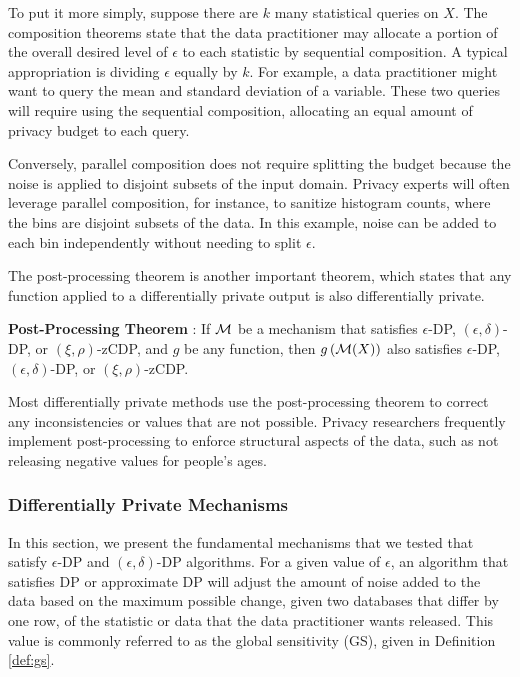 To put it more simply, suppose there are $k$ many statistical queries on $X$. The composition theorems state that the data practitioner may allocate a portion of the overall desired level of $\epsilon$ to each statistic by sequential composition. A typical appropriation is dividing $\epsilon$ equally by $k$. For example, a data practitioner might want to query the mean and standard deviation of a variable. These two queries will require using the sequential composition, allocating an equal amount of privacy budget to each query.

Conversely, parallel composition does not require splitting the budget because the noise is applied to disjoint subsets of the input domain. Privacy experts will often leverage parallel composition, for instance, to sanitize histogram counts, where the bins are disjoint subsets of the data. In this example, noise can be added to each bin independently without needing to split $\epsilon$.

The post-processing theorem is another important theorem, which states that any function applied to a differentially private output is also differentially private.

\begin{thm}\label{thm:post} \textbf{Post-Processing Theorem} \citep{dwork2006calibrating,nissim2007smooth, bun2016concentrated}:
If $\mathcal{M}$ be a mechanism that satisfies $\epsilon$-DP, $(\epsilon,\delta)$-DP, or $(\xi,\rho)$-zCDP, and $g$ be any function, then $g\left(\mathcal{M}(X)\right)$ also satisfies $\epsilon$-DP, $(\epsilon,\delta)$-DP, or $(\xi,\rho)$-zCDP.
\end{thm}

Most differentially private methods use the post-processing theorem to correct any inconsistencies or values that are not possible. Privacy researchers frequently implement post-processing to enforce structural aspects of the data, such as not releasing negative values for people's ages.

\subsubsection{Differentially Private Mechanisms}\label{subsec:mech}
In this section, we present the fundamental mechanisms that we tested that satisfy $\epsilon$-DP and $(\epsilon, \delta)$-DP algorithms. For a given value of $\epsilon$, an algorithm that satisfies DP or approximate DP will adjust the amount of noise added to the data based on the maximum possible change, given two databases that differ by one row, of the statistic or data that the data practitioner wants released. This value is commonly referred to as the global sensitivity (GS), given in Definition \ref{def:gs}.

